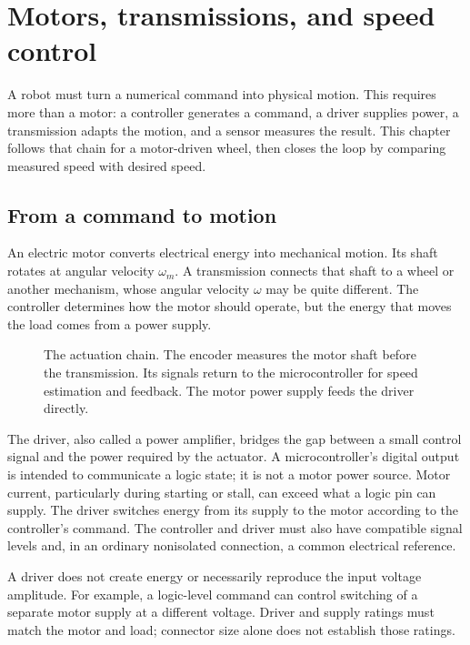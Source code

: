 \chapter{Motors, transmissions, and speed control}
\label{ch:motors}

A robot must turn a numerical command into physical motion. This requires
more than a motor: a controller generates a command, a driver supplies power,
a transmission adapts the motion, and a sensor measures the result. This
chapter follows that chain for a motor-driven wheel, then closes the loop
by comparing measured speed with desired speed.

\section{From a command to motion}
An electric motor converts electrical energy into mechanical motion. Its
shaft rotates at angular velocity $\omega_m$. A transmission connects that
shaft to a wheel or another mechanism, whose angular velocity $\omega$ may
be quite different. The controller determines how the motor should operate,
but the energy that moves the load comes from a power supply.

\begin{figure}[htbp]
\centering
\caption{The actuation chain. The encoder measures the motor shaft before
the transmission. Its signals return to the microcontroller for speed estimation
and feedback. The motor power supply feeds the driver directly.}
\label{fig:l08-chain}
\end{figure}

The driver, also called a power amplifier, bridges the gap between a small
control signal and the power required by the actuator. A microcontroller's
digital output is intended to communicate a logic state; it is not a motor
power source. Motor current, particularly during starting or stall, can exceed
what a logic pin can supply. The driver switches energy from its supply to
the motor according to the controller's command. The controller and driver
must also have compatible signal levels and, in an ordinary nonisolated
connection, a common electrical reference.

A driver does not create energy or necessarily reproduce the input voltage
amplitude. For example, a logic-level command can control switching of a
separate motor supply at a different voltage. Driver and supply ratings must
match the motor and load; connector size alone does not establish those ratings.

